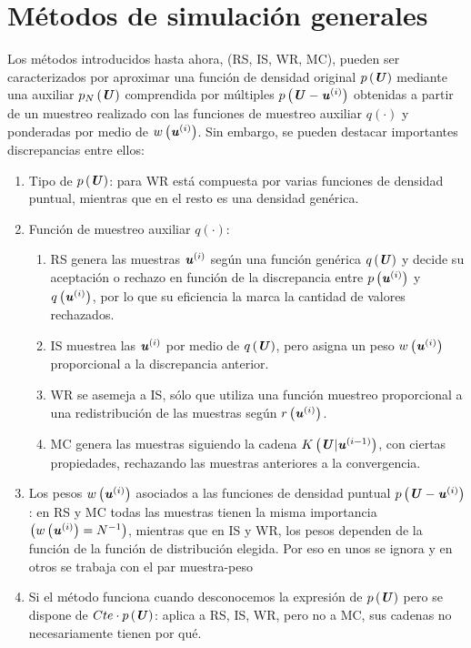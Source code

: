 \section{Métodos de simulación generales}
Los métodos introducidos hasta ahora, (RS, IS, WR, MC), pueden ser caracterizados por aproximar una función de densidad original $p\left(\textbf{\textit{U}}\right)$ mediante una auxiliar $p_N\left(\textbf{\textit{U}}\right)$ comprendida por múltiples $p\left(\textbf{\textit{U}} - \textbf{\textit{u}}^{(i)}\right)$ obtenidas a partir de un muestreo realizado con las funciones de muestreo auxiliar $q(\cdot)$ y ponderadas por medio de $w\left(\textbf{\textit{u}}^{(i)}\right)$. Sin embargo, se pueden destacar importantes discrepancias entre ellos:
\begin{enumerate}
    \item Tipo de $p\left(\textbf{\textit{U}}\right)$: para WR está compuesta por varias funciones de densidad puntual, mientras que en el resto es una densidad genérica.
    \item Función de muestreo auxiliar $q(\cdot)$:
    \begin{enumerate}
        \item RS genera las muestras $\textbf{\textit{u}}^{(i)}$ según una función genérica $q\left(\textbf{\textit{U}}\right)$ y decide su aceptación o rechazo en función de la discrepancia entre $p\left(\textbf{\textit{u}}^{(i)}\right)$ y $q\left(\textbf{\textit{u}}^{(i)}\right)$, por lo que su eficiencia la marca la cantidad de valores rechazados.
        \item IS muestrea las $\textbf{\textit{u}}^{(i)}$ por medio de $q\left(\textbf{\textit{U}}\right)$, pero asigna un peso $w\left(\textbf{\textit{u}}^{(i)}\right)$ proporcional a la discrepancia anterior.
        \item WR se asemeja a IS, sólo que utiliza una función muestreo proporcional a una redistribución de las muestras según $r\left(\textbf{\textit{u}}^{(i)}\right)$.
        \item MC genera las muestras siguiendo la cadena $K\left(\textbf{\textit{U}}|\textbf{\textit{u}}^{(i-1)}\right)$, con ciertas propiedades, rechazando las muestras anteriores a la convergencia.
    \end{enumerate}
    \item Los pesos $w\left(\textbf{\textit{u}}^{(i)}\right)$ asociados a las funciones de densidad puntual $p\left(\textbf{\textit{U}}-\textbf{\textit{u}}^{(i)}\right)$: en RS y MC todas las muestras tienen la misma importancia $\left(w\left(\textbf{\textit{u}}^{(i)}\right) = N^{-1}\right)$, mientras que en IS y WR, los pesos dependen de la función de la función de distribución elegida. Por eso en unos se ignora y en otros se trabaja con el par muestra-peso
    \item Si el método funciona cuando desconocemos la expresión de $p\left(\textbf{\textit{U}}\right)$ pero se dispone de $Cte\cdot p\left(\textbf{\textit{U}}\right)$: aplica a RS, IS, WR, pero no a MC, sus cadenas no necesariamente tienen por qué. 
\end{enumerate}

